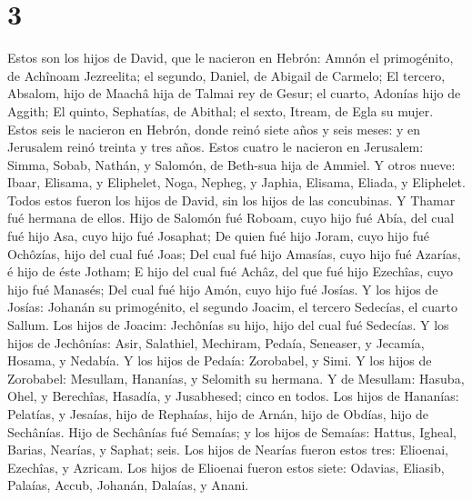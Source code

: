 \hypertarget{section-2}{%
\section{3}\label{section-2}}

 Estos son los hijos de David, que le nacieron en Hebrón:
Amnón el primogénito, de Achînoam Jezreelita; el segundo, Daniel, de
Abigail de Carmelo;  El tercero, Absalom, hijo de Maachâ
hija de Talmai rey de Gesur; el cuarto, Adonías hijo de Aggith;
 El quinto, Sephatías, de Abithal; el sexto, Itream, de
Egla su mujer.  Estos seis le nacieron en Hebrón, donde
reinó siete años y seis meses: y en Jerusalem reinó treinta y tres años.
 Estos cuatro le nacieron en Jerusalem: Simma, Sobab,
Nathán, y Salomón, de Beth-sua hija de Ammiel.  Y otros
nueve: Ibaar, Elisama, y Eliphelet,  Noga, Nepheg, y
Japhia,  Elisama, Eliada, y Eliphelet. 
Todos estos fueron los hijos de David, sin los hijos de las concubinas.
Y Thamar fué hermana de ellos.  Hijo de Salomón fué
Roboam, cuyo hijo fué Abía, del cual fué hijo Asa, cuyo hijo fué
Josaphat;  De quien fué hijo Joram, cuyo hijo fué
Ochôzías, hijo del cual fué Joas;  Del cual fué hijo
Amasías, cuyo hijo fué Azarías, é hijo de éste Jotham;  E
hijo del cual fué Achâz, del que fué hijo Ezechîas, cuyo hijo fué
Manasés;  Del cual fué hijo Amón, cuyo hijo fué Josías.
 Y los hijos de Josías: Johanán su primogénito, el
segundo Joacim, el tercero Sedecías, el cuarto Sallum. 
Los hijos de Joacim: Jechônías su hijo, hijo del cual fué Sedecías.
 Y los hijos de Jechônías: Asir, Salathiel,
 Mechiram, Pedaía, Seneaser, y Jecamía, Hosama, y
Nedabía.  Y los hijos de Pedaía: Zorobabel, y Simi. Y los
hijos de Zorobabel: Mesullam, Hananías, y Selomith su hermana.
 Y de Mesullam: Hasuba, Ohel, y Berechîas, Hasadía, y
Jusabhesed; cinco en todos.  Los hijos de Hananías:
Pelatías, y Jesaías, hijo de Rephaías, hijo de Arnán, hijo de Obdías,
hijo de Sechânías.  Hijo de Sechânías fué Semaías; y los
hijos de Semaías: Hattus, Igheal, Barias, Nearías, y Saphat; seis.
 Los hijos de Nearías fueron estos tres: Elioenai,
Ezechîas, y Azricam.  Los hijos de Elioenai fueron estos
siete: Odavias, Eliasib, Palaías, Accub, Johanán, Dalaías, y Anani.

